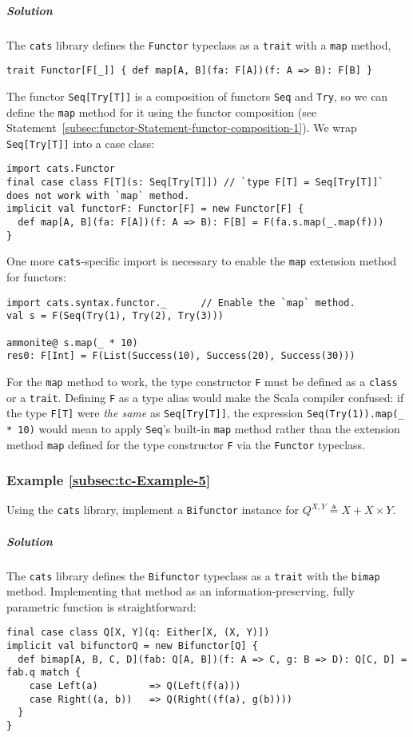 \subparagraph{Solution}

The \texttt{cats} library defines the \lstinline!Functor! typeclass
as a \lstinline!trait! with a \lstinline!map! method,
\begin{lstlisting}
trait Functor[F[_]] { def map[A, B](fa: F[A])(f: A => B): F[B] }
\end{lstlisting}
The functor \lstinline!Seq[Try[T]]! is a composition of functors
\lstinline!Seq! and \lstinline!Try!, so we can define the \lstinline!map!
method for it using the functor composition (see Statement~\ref{subsec:functor-Statement-functor-composition-1}).
We wrap \lstinline!Seq[Try[T]]! into a case class:
\begin{lstlisting}
import cats.Functor
final case class F[T](s: Seq[Try[T]]) // `type F[T] = Seq[Try[T]]` does not work with `map` method.
implicit val functorF: Functor[F] = new Functor[F] {
  def map[A, B](fa: F[A])(f: A => B): F[B] = F(fa.s.map(_.map(f)))
}
\end{lstlisting}
One more \texttt{cats}-specific import is necessary to enable the
\lstinline!map! extension method for functors:
\begin{lstlisting}
import cats.syntax.functor._      // Enable the `map` method.
val s = F(Seq(Try(1), Try(2), Try(3)))

ammonite@ s.map(_ * 10)
res0: F[Int] = F(List(Success(10), Success(20), Success(30)))
\end{lstlisting}
For the \lstinline!map! method to work, the type constructor \lstinline!F!
must be defined as a \lstinline!class! or a \lstinline!trait!. Defining
\lstinline!F! as a type alias would make the Scala compiler confused:
if the type \lstinline!F[T]! were \emph{the same} as \lstinline!Seq[Try[T]]!,
the expression \lstinline!Seq(Try(1)).map(_ * 10)! would mean to
apply \lstinline!Seq!\textsf{'}s built-in \lstinline!map! method rather than
the extension method \lstinline!map! defined for the type constructor
\lstinline!F! via the \lstinline!Functor! typeclass.

\subsubsection{Example \label{subsec:tc-Example-5}\ref{subsec:tc-Example-5}}

Using the \texttt{cats} library, implement a \lstinline!Bifunctor!
instance for $Q^{X,Y}\triangleq X+X\times Y$.

\subparagraph{Solution}

The \texttt{cats} library defines the \lstinline!Bifunctor! typeclass
as a \lstinline!trait! with the \lstinline!bimap! method. Implementing
that method as an information-preserving, fully parametric function
is straightforward:
\begin{lstlisting}
final case class Q[X, Y](q: Either[X, (X, Y)])
implicit val bifunctorQ = new Bifunctor[Q] {
  def bimap[A, B, C, D](fab: Q[A, B])(f: A => C, g: B => D): Q[C, D] = fab.q match {
    case Left(a)         => Q(Left(f(a)))
    case Right((a, b))   => Q(Right((f(a), g(b))))
  }
}
\end{lstlisting}


